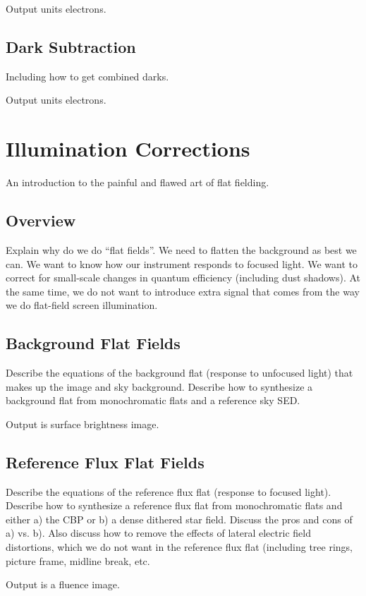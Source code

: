 Output units electrons.

\subsection{Dark Subtraction}
Including how to get combined darks.

Output units electrons.

\section{Illumination Corrections}
An introduction to the painful and flawed art of flat fielding.

\subsection{Overview}
Explain why do we do “flat fields”. 
We need to flatten the background as best we can.
We want to know how our instrument responds to focused light. 
We want to correct for small-scale changes in quantum efficiency (including dust shadows).
At the same time, we do not want to introduce extra signal that comes from the way we do flat-field screen illumination.  


\subsection{Background Flat Fields}
Describe the equations of the background flat (response to unfocused light) that makes up the image and sky background.  
Describe how to synthesize a background flat from monochromatic flats and a reference sky SED.

Output is surface brightness image.

\subsection{Reference Flux Flat Fields}
Describe the equations of the reference flux flat (response to focused light).  
Describe how to synthesize a reference flux flat from monochromatic flats and either a) the CBP or b) a dense dithered star field.  
Discuss the pros and cons of a) vs. b).
Also discuss how to remove the effects of lateral electric field distortions, which we do not want in the reference flux flat (including tree rings, picture frame, midline break, etc.

Output is a fluence image.

